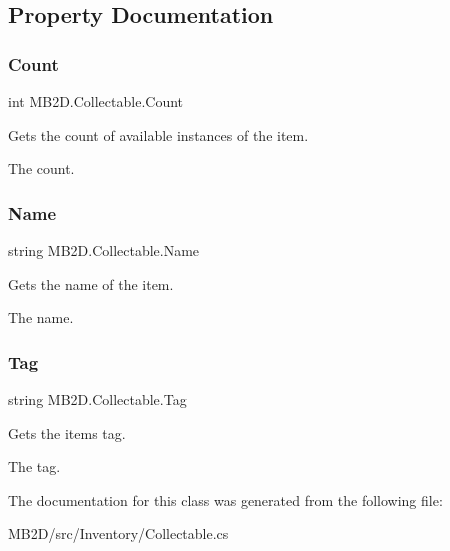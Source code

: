 \subsection{Property Documentation}
\hypertarget{class_m_b2_d_1_1_collectable_a775364ada5d2f8095ca601657da20fc1}{}\label{class_m_b2_d_1_1_collectable_a775364ada5d2f8095ca601657da20fc1} 
\subsubsection{\texorpdfstring{Count}{Count}}
{\footnotesize\ttfamily int M\+B2\+D.\+Collectable.\+Count\hspace{0.3cm}{\ttfamily [get]}}



Gets the count of available instances of the item. 

The count.\hypertarget{class_m_b2_d_1_1_collectable_a80d6ce8bb84f84a86ffbd58ad6237e9a}{}\label{class_m_b2_d_1_1_collectable_a80d6ce8bb84f84a86ffbd58ad6237e9a} 
\subsubsection{\texorpdfstring{Name}{Name}}
{\footnotesize\ttfamily string M\+B2\+D.\+Collectable.\+Name\hspace{0.3cm}{\ttfamily [get]}}



Gets the name of the item. 

The name.\hypertarget{class_m_b2_d_1_1_collectable_a97f42790fdafd06634b87cd4023bc0fe}{}\label{class_m_b2_d_1_1_collectable_a97f42790fdafd06634b87cd4023bc0fe} 
\subsubsection{\texorpdfstring{Tag}{Tag}}
{\footnotesize\ttfamily string M\+B2\+D.\+Collectable.\+Tag\hspace{0.3cm}{\ttfamily [get]}}



Gets the items tag. 

The tag.

The documentation for this class was generated from the following file\+:\begin{DoxyCompactItemize}
\item 
M\+B2\+D/src/\+Inventory/Collectable.\+cs\end{DoxyCompactItemize}
